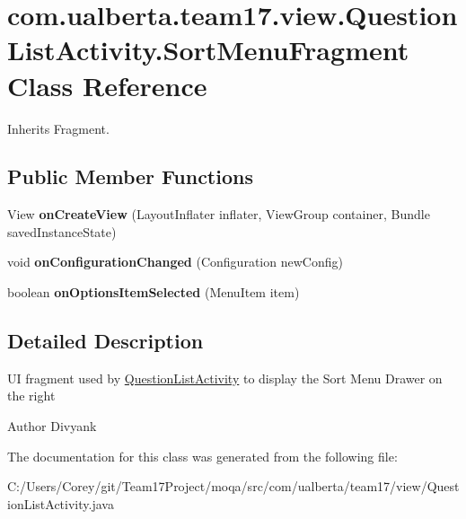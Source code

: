 \hypertarget{classcom_1_1ualberta_1_1team17_1_1view_1_1_question_list_activity_1_1_sort_menu_fragment}{\section{com.\+ualberta.\+team17.\+view.\+Question\+List\+Activity.\+Sort\+Menu\+Fragment Class Reference}
\label{classcom_1_1ualberta_1_1team17_1_1view_1_1_question_list_activity_1_1_sort_menu_fragment}
}


Inherits Fragment.

\subsection*{Public Member Functions}
\begin{DoxyCompactItemize}
\item 
\hypertarget{classcom_1_1ualberta_1_1team17_1_1view_1_1_question_list_activity_1_1_sort_menu_fragment_ab805fcf748f8fe96736a4047310ec2b7}{View {\bfseries on\+Create\+View} (Layout\+Inflater inflater, View\+Group container, Bundle saved\+Instance\+State)}\label{classcom_1_1ualberta_1_1team17_1_1view_1_1_question_list_activity_1_1_sort_menu_fragment_ab805fcf748f8fe96736a4047310ec2b7}

\item 
\hypertarget{classcom_1_1ualberta_1_1team17_1_1view_1_1_question_list_activity_1_1_sort_menu_fragment_a126e2139691ecb7a2583beac4db17eb8}{void {\bfseries on\+Configuration\+Changed} (Configuration new\+Config)}\label{classcom_1_1ualberta_1_1team17_1_1view_1_1_question_list_activity_1_1_sort_menu_fragment_a126e2139691ecb7a2583beac4db17eb8}

\item 
\hypertarget{classcom_1_1ualberta_1_1team17_1_1view_1_1_question_list_activity_1_1_sort_menu_fragment_a9c11a49a5590802cac2c603404853f24}{boolean {\bfseries on\+Options\+Item\+Selected} (Menu\+Item item)}\label{classcom_1_1ualberta_1_1team17_1_1view_1_1_question_list_activity_1_1_sort_menu_fragment_a9c11a49a5590802cac2c603404853f24}

\end{DoxyCompactItemize}


\subsection{Detailed Description}
U\+I fragment used by \hyperlink{classcom_1_1ualberta_1_1team17_1_1view_1_1_question_list_activity}{Question\+List\+Activity} to display the Sort Menu Drawer on the right

\begin{DoxyAuthor}{Author}
Divyank 
\end{DoxyAuthor}


The documentation for this class was generated from the following file\+:\begin{DoxyCompactItemize}
\item 
C\+:/\+Users/\+Corey/git/\+Team17\+Project/moqa/src/com/ualberta/team17/view/Question\+List\+Activity.\+java\end{DoxyCompactItemize}
